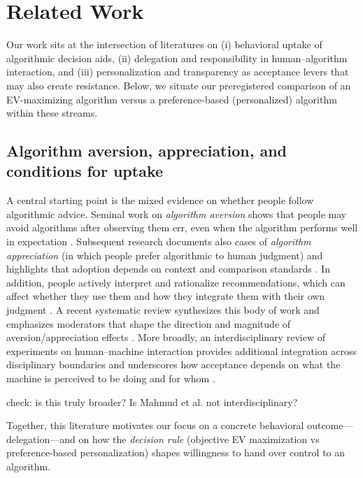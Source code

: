 \documentclass[a4paper, 12pt, fleqn]{article}
\theoremstyle{definition}
\begin{document}
\section{Related Work}
\label{sec:related}

Our work sits at the intersection of literatures on (i) behavioral uptake of algorithmic decision aids, (ii) delegation and responsibility in human--algorithm interaction, and (iii) personalization and transparency as acceptance levers that may also create resistance. Below, we situate our preregistered comparison of an EV-maximizing algorithm versus a preference-based (personalized) algorithm within these streams.

\subsection{Algorithm aversion, appreciation, and conditions for uptake}
A central starting point is the mixed evidence on whether people follow algorithmic advice. Seminal work on \emph{algorithm aversion} shows that people may avoid algorithms after observing them err, even when the algorithm performs well in expectation \citep{Dietvorst2018}. Subsequent research documents also cases of \emph{algorithm appreciation} (in which people prefer algorithmic to human judgment) and highlights that adoption depends on context and comparison standards \citep{Logg2019}. In addition, people actively interpret and rationalize recommendations, which can affect whether they use them and how they integrate them with their own judgment \citep{Yeomans2019}. A recent systematic review synthesizes this body of work and emphasizes moderators that shape the direction and magnitude of aversion/appreciation effects \citep{Mahmud2022}. More broadly, an interdisciplinary review of experiments on human--machine interaction provides additional integration across disciplinary boundaries and underscores how acceptance depends on what the machine is perceived to be doing and for whom \citep{Chugunova2022}. 
\begin{icomm}
	check: is this truly broader? Is Mahmud et al. not interdisciplinary?
\end{icomm}
Together, this literature motivates our focus on a concrete behavioral outcome---delegation---and on how the \emph{decision rule} (objective EV maximization vs preference-based personalization) shapes willingness to hand over control to an algorithm.
\end{document}
